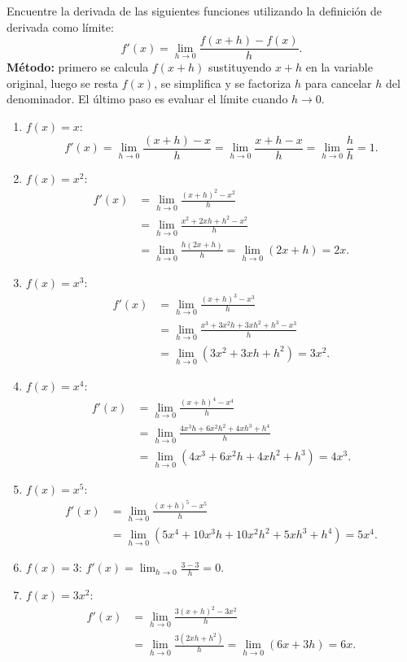 \documentclass[12pt, letterpaper]{article}
\makeatletter
\renewcommand{\alph}[1]{\expandafter\@alphlatin\csname c@#1\endcsname}
\newcommand{\@alphlatin}[1]{\ifcase#1\or a\or b\or c\or d\or e\or f\or g\or h\or i\or j\or k\or l\or m\or n\or o\or p\or q\or r\or s\or t\or u\or v\or w\or x\or y\or z\else\@ctrerr\fi}
\makeatother
\begin{document}
Encuentre la derivada de las siguientes funciones utilizando la definición de derivada como límite:
\[
f'(x)=\lim_{h\to0}\frac{f(x+h)-f(x)}{h}.
\]
\textbf{Método:} primero se calcula $f(x+h)$ sustituyendo $x+h$ en la variable original, luego se resta $f(x)$, se simplifica y se factoriza $h$ para cancelar $h$ del denominador. El último paso es evaluar el límite cuando $h\to0$.
\begin{enumerate}[label=\alph*)]
  \item $f(x)=x$:
  \[
  f'(x)=\lim_{h\to0}\frac{(x+h)-x}{h}
  =\lim_{h\to0}\frac{x+h-x}{h}
  =\lim_{h\to0}\frac{h}{h}
  =\boxed{1}.
  \]
  \item $f(x)=x^2$:
  \[
  \begin{aligned}
  f'(x)&=\lim_{h\to0}\frac{(x+h)^2-x^2}{h}\\
  &=\lim_{h\to0}\frac{x^2+2xh+h^2-x^2}{h}\\
  &=\lim_{h\to0}\frac{h(2x+h)}h
  =\lim_{h\to0}(2x+h)=\boxed{2x}.
  \end{aligned}
  \]
  \item $f(x)=x^3$:
  \[
  \begin{aligned}
  f'(x)&=\lim_{h\to0}\frac{(x+h)^3-x^3}{h}\\
  &=\lim_{h\to0}\frac{x^3+3x^2h+3xh^2+h^3-x^3}{h}\\
  &=\lim_{h\to0}(3x^2+3xh+h^2)=\boxed{3x^2}.
  \end{aligned}
  \]
  \item $f(x)=x^4$:
  \[
  \begin{aligned}
  f'(x)&=\lim_{h\to0}\frac{(x+h)^4-x^4}{h}\\
  &=\lim_{h\to0}\frac{4x^3h+6x^2h^2+4xh^3+h^4}{h}\\
  &=\lim_{h\to0}(4x^3+6x^2h+4xh^2+h^3)=\boxed{4x^3}.
  \end{aligned}
  \]
  \item $f(x)=x^5$:
  \[
  \begin{aligned}
  f'(x)&=\lim_{h\to0}\frac{(x+h)^5-x^5}{h}\\
  &=\lim_{h\to0}(5x^4+10x^3h+10x^2h^2+5xh^3+h^4)
  =\boxed{5x^4}.
  \end{aligned}
  \]
  \item $f(x)=3$:
  $\displaystyle f'(x)=\lim_{h\to0}\frac{3-3}{h}=\boxed{0}$.
  \item $f(x)=3x^2$:
  \[
  \begin{aligned}
  f'(x)&=\lim_{h\to0}\frac{3(x+h)^2-3x^2}{h}\\
  &=\lim_{h\to0}\frac{3(2xh+h^2)}h
  =\lim_{h\to0}(6x+3h)=\boxed{6x}.

\end{aligned}\]
\end{enumerate}
\end{document}
